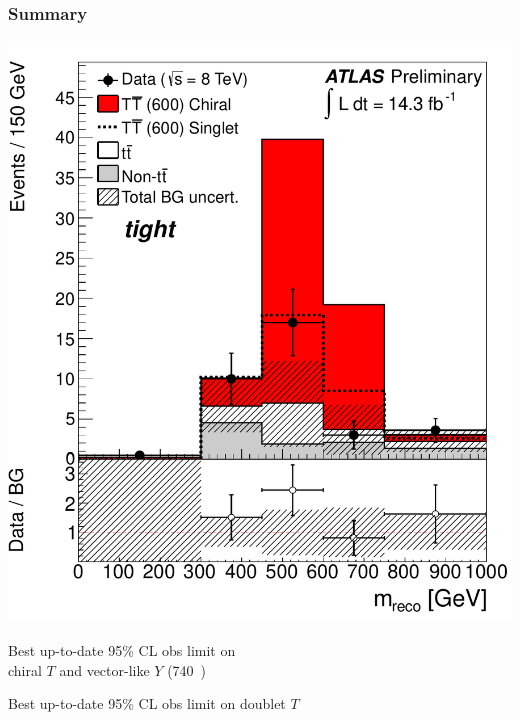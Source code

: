 
\begin{frame}\frametitle{Summary}
\footnotesize\centering

\begin{minipage}{.3\textwidth}\centering
\includegraphics[width=.8\textwidth]{pics/VLQAna_WbX_1W_MWb_4_ELEMUON_cutflow1234567_NOMINAL.pdf}
\end{minipage}\begin{minipage}{.7\textwidth}\centering

\myskip
Best up-to-date 95\% CL obs limit on \\
chiral $T$ and vector-like $Y$ (740~\gev)

\end{minipage}

\begin{minipage}{.7\textwidth}\centering

\myskip
Best up-to-date 95\% CL obs limit on doublet $T$


\end{minipage}
\end{frame}
